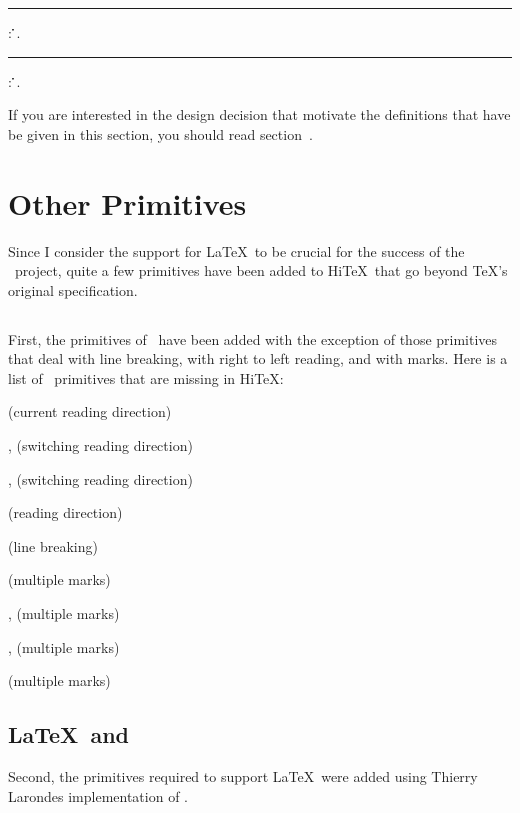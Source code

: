 \medskip{}
\rule {}:
   \opt{\.{=}} \.{\LB}\.{\RB}.
\rule {}:
   \opt{\.{=}} \.{\LB}\.{\RB}.
\medskip

If you are interested in the design decision that motivate the definitions that have
be given in this section, you should read section~.

\section{Other Primitives}

Since I consider the support for \LaTeX\ to be crucial for
the success of the \HINT\ project, quite a few primitives
have been added to Hi\TeX\ that go beyond \TeX's original
specification. 

\subsection{\eTeX}
First, the primitives of \eTeX\ have been
added with the exception of those primitives that deal with
line breaking, with right to left reading, and with marks. 
Here is a list of \eTeX\ primitives that are missing in Hi\TeX:
\itemize
\item{} (current reading direction)
\item{},   (switching reading direction)
\item{},  (switching reading direction)
\item{}  (reading direction)
\item{}  (line breaking)
\item{}  (multiple marks)
\item{},    (multiple marks)
\item{},   (multiple marks)
\item{}  (multiple marks)
\enditemize 

\subsection{\LaTeX\ and \Prote}
Second, the primitives required to support
\LaTeX\ were added using Thierry Larondes implementation of \Prote.

